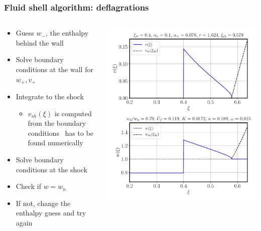 \begin{frame}
    \frametitle{Fluid shell algorithm: deflagrations}
    \begin{columns}
    \begin{column}{0.6\textwidth}
        \begin{itemize}
                \item Guess $w_-$, the enthalpy behind the wall
                \item Solve boundary conditions at the wall for $w_+, v_+$
                \item Integrate to the shock
                \begin{itemize}
                    \item $v_{sh}(\xi)$ is computed from the boundary conditions \textrightarrow \ has to be found numerically
                \end{itemize}
                \item Solve boundary conditions at the shock
                \item Check if $w=w_n$
                \item If not, change the enthalpy guess and try again
        \end{itemize}
    \end{column}
    \begin{column}{0.4\textwidth}
        \includegraphics[width=\textwidth]{../fig/shell_plot_vw_04_alphan_01_review}
    \end{column}
    \end{columns}
\end{frame}

